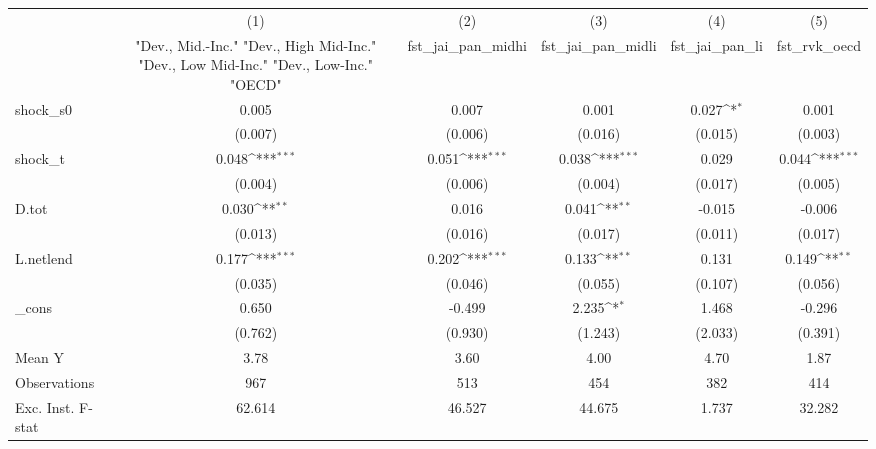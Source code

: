 {
\def\sym#1{\ifmmode^{#1}\else\(^{#1}\)\fi}
\begin{tabular}{l*{5}{c}}
\toprule
            &\multicolumn{1}{c}{(1)}&\multicolumn{1}{c}{(2)}&\multicolumn{1}{c}{(3)}&\multicolumn{1}{c}{(4)}&\multicolumn{1}{c}{(5)}\\
            &\multicolumn{1}{c}{ "Dev., Mid.-Inc." "Dev., High Mid-Inc." "Dev., Low Mid-Inc." "Dev., Low-Inc." "OECD" }&\multicolumn{1}{c}{fst\_jai\_pan\_midhi}&\multicolumn{1}{c}{fst\_jai\_pan\_midli}&\multicolumn{1}{c}{fst\_jai\_pan\_li}&\multicolumn{1}{c}{fst\_rvk\_oecd}\\
\midrule
shock\_s0    &       0.005         &       0.007         &       0.001         &       0.027\sym{*}  &       0.001         \\
            &     (0.007)         &     (0.006)         &     (0.016)         &     (0.015)         &     (0.003)         \\
\addlinespace
shock\_t     &       0.048\sym{***}&       0.051\sym{***}&       0.038\sym{***}&       0.029         &       0.044\sym{***}\\
            &     (0.004)         &     (0.006)         &     (0.004)         &     (0.017)         &     (0.005)         \\
\addlinespace
D.tot       &       0.030\sym{**} &       0.016         &       0.041\sym{**} &      -0.015         &      -0.006         \\
            &     (0.013)         &     (0.016)         &     (0.017)         &     (0.011)         &     (0.017)         \\
\addlinespace
L.netlend   &       0.177\sym{***}&       0.202\sym{***}&       0.133\sym{**} &       0.131         &       0.149\sym{**} \\
            &     (0.035)         &     (0.046)         &     (0.055)         &     (0.107)         &     (0.056)         \\
\addlinespace
\_cons      &       0.650         &      -0.499         &       2.235\sym{*}  &       1.468         &      -0.296         \\
            &     (0.762)         &     (0.930)         &     (1.243)         &     (2.033)         &     (0.391)         \\
\midrule
Mean Y      &        3.78         &        3.60         &        4.00         &        4.70         &        1.87         \\
Observations&         967         &         513         &         454         &         382         &         414         \\
Exc. Inst. F-stat&      62.614         &      46.527         &      44.675         &       1.737         &      32.282         \\
\bottomrule
\end{tabular}
}
